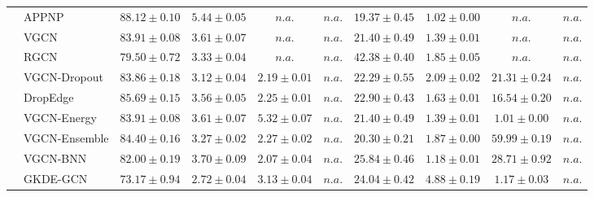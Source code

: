 \begin{table*}[!h]
{\begin{tabular}{ll|cccc|cccc}
        & APPNP & ${\mathbf{88.12}\scriptscriptstyle \pm 0.10}$ & ${\mathbf{5.44}\scriptscriptstyle \pm 0.05}$ & $n.a.$ & $n.a.$ & ${19.37\scriptscriptstyle \pm 0.45}$ & ${1.02\scriptscriptstyle \pm 0.00}$ & $n.a.$ & $n.a.$\\
        & VGCN & ${83.91\scriptscriptstyle \pm 0.08}$ & ${3.61\scriptscriptstyle \pm 0.07}$ & $n.a.$ & $n.a.$ & ${21.40\scriptscriptstyle \pm 0.49}$ & ${1.39\scriptscriptstyle \pm 0.01}$ & $n.a.$ & $n.a.$\\
        & RGCN & ${79.50\scriptscriptstyle \pm 0.72}$ & ${3.33\scriptscriptstyle \pm 0.04}$ & $n.a.$ & $n.a.$ & ${42.38\scriptscriptstyle \pm 0.40}$ & ${1.85\scriptscriptstyle \pm 0.05}$ & $n.a.$ & $n.a.$\\
        & VGCN-Dropout & ${83.86\scriptscriptstyle \pm 0.18}$ & ${3.12\scriptscriptstyle \pm 0.04}$ & ${2.19\scriptscriptstyle \pm 0.01}$ & $n.a.$ & ${22.29\scriptscriptstyle \pm 0.55}$ & ${2.09\scriptscriptstyle \pm 0.02}$ & ${21.31\scriptscriptstyle \pm 0.24}$ & $n.a.$\\
        & DropEdge & ${85.69\scriptscriptstyle \pm 0.15}$ & ${3.56\scriptscriptstyle \pm 0.05}$ & ${2.25\scriptscriptstyle \pm 0.01}$ & $n.a.$ & ${22.90\scriptscriptstyle \pm 0.43}$ & ${1.63\scriptscriptstyle \pm 0.01}$ & ${16.54\scriptscriptstyle \pm 0.20}$ & $n.a.$\\
        & VGCN-Energy & ${83.91\scriptscriptstyle \pm 0.08}$ & ${3.61\scriptscriptstyle \pm 0.07}$ & ${{5.32}\scriptscriptstyle \pm 0.07}$ & $n.a.$ & ${21.40\scriptscriptstyle \pm 0.49}$ & ${1.39\scriptscriptstyle \pm 0.01}$ & ${1.01\scriptscriptstyle \pm 0.00}$ & $n.a.$\\
        & VGCN-Ensemble & ${84.40\scriptscriptstyle \pm 0.16}$ & ${3.27\scriptscriptstyle \pm 0.02}$ & ${2.27\scriptscriptstyle \pm 0.02}$ & $n.a.$ & ${20.30\scriptscriptstyle \pm 0.21}$ & ${1.87\scriptscriptstyle \pm 0.00}$ & ${{59.99}\scriptscriptstyle \pm 0.19}$ & $n.a.$\\
        & VGCN-BNN & ${82.00\scriptscriptstyle \pm 0.19}$ & ${3.70\scriptscriptstyle \pm 0.09}$ & ${2.07\scriptscriptstyle \pm 0.04}$ & $n.a.$ & ${25.84\scriptscriptstyle \pm 0.46}$ & ${1.18\scriptscriptstyle \pm 0.01}$ & ${28.71\scriptscriptstyle \pm 0.92}$ & $n.a.$\\
        & GKDE-GCN & ${73.17\scriptscriptstyle \pm 0.94}$ & ${2.72\scriptscriptstyle \pm 0.04}$ & ${3.13\scriptscriptstyle \pm 0.04}$ & $n.a.$ & ${24.04\scriptscriptstyle \pm 0.42}$ & ${4.88\scriptscriptstyle \pm 0.19}$ & ${1.17\scriptscriptstyle \pm 0.03}$ & $n.a.$\\

\end{tabular}}
\end{table*}
